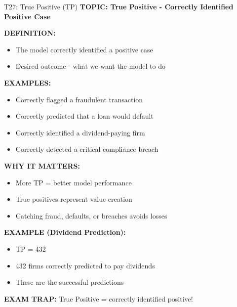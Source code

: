 \documentclass[8pt]{beamer}
\begin{document}
	\begin{frame}{T27: True Positive (TP)}
		\fontsize{6.5}{7.5}\selectfont
		\textbf{TOPIC: True Positive - Correctly Identified Positive Case}
		
		\vspace{0.1cm}
		\textbf{DEFINITION:}
		\begin{itemize}
			\item The model correctly identified a positive case
			\item Desired outcome - what we want the model to do
		\end{itemize}
		
		\vspace{0.1cm}
		\textbf{EXAMPLES:}
		\begin{itemize}
			\item Correctly flagged a fraudulent transaction
			\item Correctly predicted that a loan would default
			\item Correctly identified a dividend-paying firm
			\item Correctly detected a critical compliance breach
		\end{itemize}
		
		\vspace{0.1cm}
		\textbf{WHY IT MATTERS:}
		\begin{itemize}
			\item More TP = better model performance
			\item True positives represent value creation
			\item Catching fraud, defaults, or breaches avoids losses
		\end{itemize}
		
		\vspace{0.1cm}
		\textbf{EXAMPLE (Dividend Prediction):}
		\begin{itemize}
			\item TP = 432
			\item 432 firms correctly predicted to pay dividends
			\item These are the successful predictions
		\end{itemize}
		
		\textcolor{myred}{\textbf{EXAM TRAP:}} True Positive = \textcolor{myblue}{correctly identified positive}!
	\end{frame}
	
\end{document}
